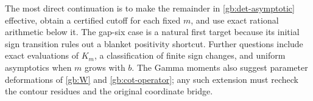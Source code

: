 The most direct continuation is to make the remainder in
\eqref{gb:det-asymptotic} effective, obtain a certified cutoff for
each fixed $m$, and use exact rational arithmetic below it.  The
gap-six case is a natural first target because its initial sign
transition rules out a blanket positivity shortcut.  Further questions
include exact evaluations of $K_m$, a classification of finite
sign changes, and uniform asymptotics when $m$ grows with $b$.
The Gamma moments also suggest parameter deformations of
\eqref{gb:W} and \eqref{gb:cot-operator}; any such extension must
recheck the contour residues and the original coordinate bridge.
